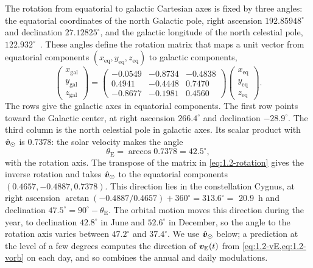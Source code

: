 The rotation from equatorial to galactic Cartesian axes is fixed by three angles: the equatorial coordinates of the north Galactic pole, right ascension $192.85948^\circ$ and declination $27.12825^\circ$, and the galactic longitude of the north celestial pole, $122.932^\circ$~\cite[App.~B, Eq.~(B3)]{mccabe2014earth}. These angles define the rotation matrix that maps a unit vector from equatorial components $(x_{\mathrm{eq}}, y_{\mathrm{eq}}, z_{\mathrm{eq}})$ to galactic components,
\begin{equation}
  \begin{pmatrix} x_{\mathrm{gal}}\\ y_{\mathrm{gal}}\\ z_{\mathrm{gal}} \end{pmatrix}
  = \begin{pmatrix} -0.0549 & -0.8734 & -0.4838\\ 0.4941 & -0.4448 & 0.7470\\ -0.8677 & -0.1981 & 0.4560 \end{pmatrix}
  \begin{pmatrix} x_{\mathrm{eq}}\\ y_{\mathrm{eq}}\\ z_{\mathrm{eq}} \end{pmatrix}.
  \label{eq:1.2-rotation}
\end{equation}
The rows give the galactic axes in equatorial components. The first row points toward the Galactic center, at right ascension $266.4^\circ$ and declination $-28.9^\circ$. The third column is the north celestial pole in galactic axes. Its scalar product with $\hat{\bm{v}}_\odot$ is $0.7378$: the solar velocity makes the angle
\begin{equation}
  \theta_{\mathrm{E}} = \arccos 0.7378 = 42.5^\circ,
  \label{eq:1.2-thetaE}
\end{equation}
with the rotation axis. The transpose of the matrix in \cref{eq:1.2-rotation} gives the inverse rotation and takes $\hat{\bm{v}}_\odot$ to the equatorial components $(0.4657, -0.4887, 0.7378)$. This direction lies in the constellation Cygnus, at right ascension $\arctan(-0.4887/0.4657) + 360^\circ = 313.6^\circ =$ \SI{20.9}{h} and declination $47.5^\circ = 90^\circ - \theta_{\mathrm{E}}$. The orbital motion moves this direction during the year, to declination $42.8^\circ$ in June and $52.6^\circ$ in December, so the angle to the rotation axis varies between $47.2^\circ$ and $37.4^\circ$. We use $\hat{\bm{v}}_\odot$ below; a prediction at the level of a few degrees computes the direction of $\bm{v}_{\mathrm{E}}(t)$ from \cref{eq:1.2-vE,eq:1.2-vorb} on each day, and so combines the annual and daily modulations.


